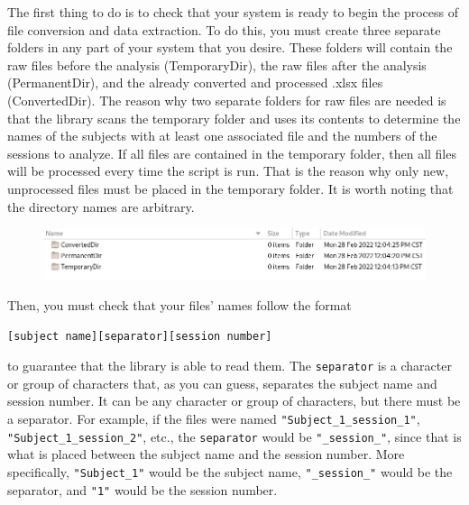 \documentclass[a4paper,12pt]{article}
\begin{document}
The first thing to do is to check that your system is ready to begin the process of file conversion and data extraction. To do this, you must create three separate folders in any part of your system that you desire. These folders will contain the raw files before the analysis (TemporaryDir), the raw files after the analysis (PermanentDir), and the already converted and processed .xlsx files (ConvertedDir). The reason why two separate folders for raw files are needed is that the library scans the temporary folder and uses its contents to determine the names of the subjects with at least one associated file and the numbers of the sessions to analyze. If all files are contained in the temporary folder, then all files will be processed every time the script is run. That is the reason why only new, unprocessed files must be placed in the temporary folder. It is worth noting that the directory names are arbitrary.

\begin{figure}[!ht]
    \begin{center}
        \includegraphics[scale=0.7]{directories.png}
    \end{center}
\end{figure}

Then, you must check that your files' names follow the format

\begin{tcolorbox}[
    enhanced,
    attach boxed title to top left={xshift=6mm,yshift=-3mm},
    colback=lightgreen!20,
    colframe=lightgreen,
    sharp corners,
    ]
    \begin{verbatim}
[subject name][separator][session number]
    \end{verbatim}
\end{tcolorbox}
\noindent to guarantee that the library is able to read them. The \verb|separator| is a character or group of characters that, as you can guess, separates the subject name and session number. It can be any character or group of characters, but there must be a separator. For example, if the files were named \verb|"Subject_1_session_1"|, \verb|"Subject_1_session_2"|, etc., the \verb|separator| would be \verb|"_session_"|, since that is what is placed between the subject name and the session number. More specifically, \verb|"Subject_1"| would be the subject name, \verb|"_session_"| would be the separator, and \verb|"1"| would be the session number.
\end{document}
